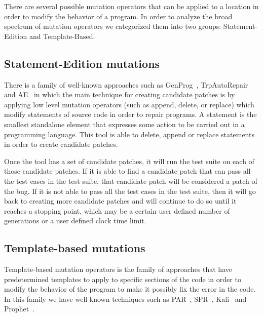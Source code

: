 \documentclass[conference]{IEEEtran}
\begin{document}
There are several possible mutation operators that can be applied to a location 
in order to modify the behavior of a program. In order to analyze the broad spectrum of mutation operators we categorized them into two groups: Statement-Edition and Template-Based. 

\subsection{Statement-Edition mutations}
There is a family of well-known approaches such as GenProg~\cite{legoues12}, 
TrpAutoRepair\cite{Qi13} and AE~\cite{Weimer13} in which the main technique for creating candidate 
patches is by applying low level mutation operators (such as append, delete, or 
replace) which modify statements of source code in order to 
repair programs. A statement is the smallest standalone element that expresses 
some action to be carried out in a programming language. This tool is able to 
delete, append or replace statements in order to create candidate patches.

Once the tool has a set of candidate patches, it will run the test suite on each 
of those candidate patches. If it is able to find a candidate patch that can 
pass all the test cases in the test suite, that candidate patch will be 
considered a patch of the bug. If it is not able to pass all the test cases in 
the test suite, then it will go back to creating more candidate patches and will 
continue to do so until it reaches a stopping point, which may be a certain user 
defined number of generations or a user defined clock time limit.


\subsection{Template-based mutations}
Template-based mutation operators is the family of approaches that have predetermined templates to apply to specific sections of the code in order to modify the behavior of the program to make it possibly fix the error in the code. In this family we have well known techniques such as PAR~\cite{kim2013}, SPR~\cite{fan15}, Kali~\cite{Qi15} and 
Prophet~\cite{Long2016}.
\end{document}
